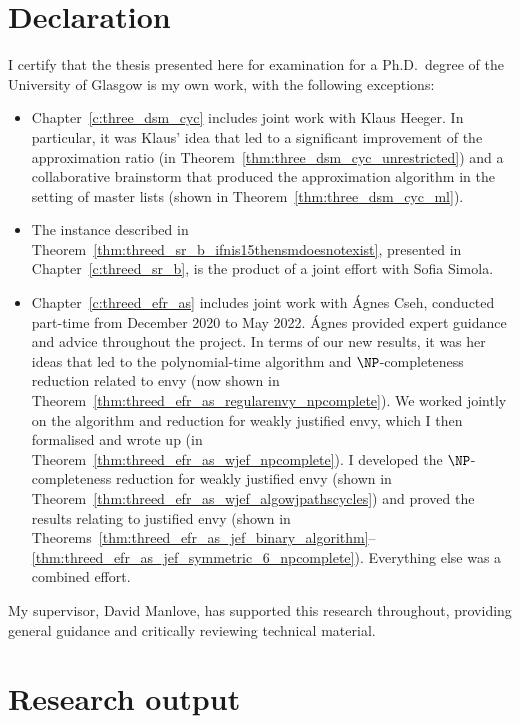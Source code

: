 \chapter*{Declaration}

I certify that the thesis presented here for examination for a Ph.D.\ degree of the University of Glasgow is my own work, with the following exceptions:
\begin{itemize}
    \item Chapter~\ref{c:three_dsm_cyc} includes joint work with Klaus Heeger. In particular, it was Klaus' idea that led to a significant improvement of the approximation ratio (in Theorem~\ref{thm:three_dsm_cyc_unrestricted}) and a collaborative brainstorm that produced the approximation algorithm in the setting of master lists (shown in Theorem~\ref{thm:three_dsm_cyc_ml}).
    \item The instance described in Theorem~\ref{thm:threed_sr_b_ifnis15thensmdoesnotexist}, presented in Chapter~\ref{c:threed_sr_b}, is the product of a joint effort with Sofia Simola. 
    \item Chapter~\ref{c:threed_efr_as} includes joint work with \'Agnes Cseh, conducted part-time from December 2020 to May 2022. \'Agnes provided expert guidance and advice throughout the project. In terms of our new results, it was her ideas that led to the polynomial-time algorithm and $\NP$-completeness reduction related to envy (now shown in Theorem~\ref{thm:threed_efr_as_regularenvy_npcomplete}). We worked jointly on the algorithm and reduction for weakly justified envy, which I then formalised and wrote up (in Theorem~\ref{thm:threed_efr_as_wjef_npcomplete}). I developed the $\NP$-completeness reduction for weakly justified envy (shown in Theorem~\ref{thm:threed_efr_as_wjef_algowjpathscycles}) and proved the results relating to justified envy (shown in Theorems~\ref{thm:threed_efr_as_jef_binary_algorithm}--\ref{thm:threed_efr_as_jef_symmetric_6_npcomplete}).  Everything else was a combined effort.
\end{itemize}

My supervisor, David Manlove, has supported this research throughout, providing general guidance and critically reviewing technical material. 

\chapter*{Research output}

